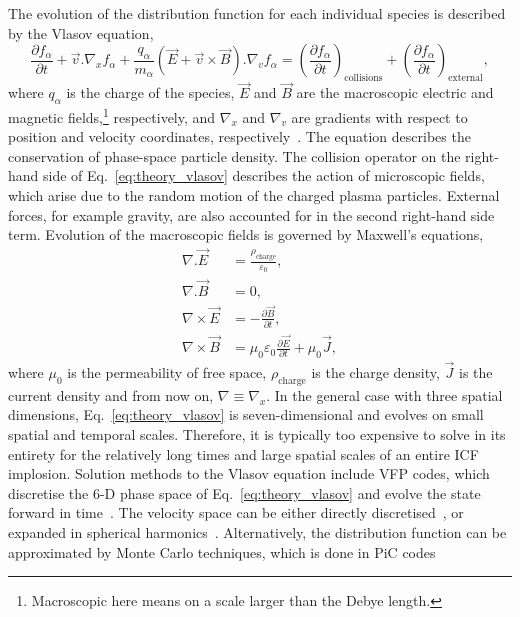 The evolution of the distribution function for each individual species is described by the Vlasov equation,
\begin{equation}
    \label{eq:theory_vlasov}
    \frac{\partial f_\alpha}{\partial t} + \vec{v}.\nabla_x f_\alpha + \frac{q_\alpha}{m_\alpha} (\vec{E} + \vec{v}\times\vec{B}) . \nabla_v f_\alpha = \left ( \frac{\partial f_\alpha}{\partial t} \right )_\text{collisions} + \left ( \frac{\partial f_\alpha}{\partial t} \right )_\text{external},
\end{equation}
where $q_\alpha$ is the charge of the species, $\vec{E}$ and $\vec{B}$ are the macroscopic electric and magnetic fields,\footnote{Macroscopic here means on a scale larger than the Debye length.} respectively, and $\nabla_x$ and $\nabla_v$ are gradients with respect to position and velocity coordinates, respectively~\cite{bittencourt_fundamentals_2004}.
The equation describes the conservation of phase-space particle density.
The collision operator on the right-hand side of Eq.~\ref{eq:theory_vlasov} describes the action of microscopic fields, which arise due to the random motion of the charged plasma particles.
External forces, for example gravity, are also accounted for in the second right-hand side term.
Evolution of the macroscopic fields is governed by Maxwell's equations,
\begin{align}
    \label{eq:theory_maxwell_eqs_1}
    \nabla.\vec{E} &= \frac{\rho_{\text{charge}}}{\varepsilon_0},\\
    \label{eq:theory_maxwell_eqs_2}
    \nabla.\vec{B} &= 0,\\
    \label{eq:theory_maxwell_eqs_3}
    \nabla \times \vec{E} &= -\frac{\partial \vec{B}}{\partial t},\\
    \label{eq:theory_maxwell_eqs_4}
    \nabla \times \vec{B} &= \mu_0 \varepsilon_0\frac{\partial \vec{E}}{\partial t} + \mu_0 \vec{J},
\end{align}
where $\mu_0$ is the permeability of free space, $\rho_{\text{charge}}$ is the charge density, $\vec{J}$ is the current density and from now on, $\nabla\equiv \nabla_x$.
In the general case with three spatial dimensions, Eq.~\ref{eq:theory_vlasov} is seven-dimensional and evolves on small spatial and temporal scales.
Therefore, it is typically too expensive to solve in its entirety for the relatively long times and large spatial scales of an entire \ac{ICF} implosion.
Solution methods to the Vlasov equation include \ac{VFP} codes, which discretise the 6-D phase space of Eq.~\ref{eq:theory_vlasov} and evolve the state forward in time~\cite{thomas_review_2012}.
The velocity space can be either directly discretised~\cite{taitano_eulerian_2021}, or expanded in spherical harmonics~\cite{kingham_implicit_2004}.
Alternatively, the distribution function can be approximated by Monte Carlo techniques, which is done in \ac{PiC} codes~\cite{arber_contemporary_2015}

